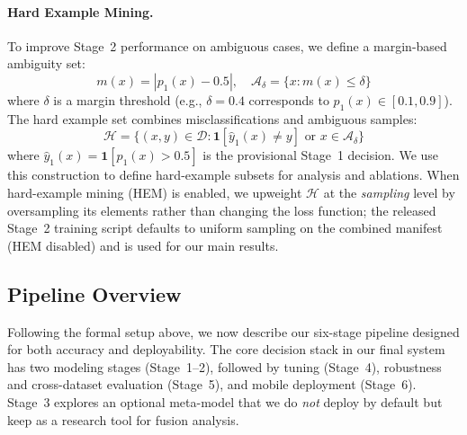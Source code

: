 \paragraph{Hard Example Mining.}
To improve Stage~2 performance on ambiguous cases, we define a margin\hyp based ambiguity set:
\begin{equation}
m(x) = |p_1(x) - 0.5|, \quad \mathcal{A}_\delta = \{x : m(x) \le \delta\}
\end{equation}
\label{eq:ambiguity_set}
where $\delta$ is a margin threshold (e.g., $\delta=0.4$ corresponds to $p_1(x) \in [0.1, 0.9]$). The hard example set combines misclassifications and ambiguous samples:
\begin{equation}
\mathcal{H} = \{(x,y) \in \mathcal{D} : \mathbf{1}[\hat{y}_1(x) \ne y] \text{ or } x \in \mathcal{A}_\delta\}
\end{equation}
\label{eq:hard_set}
where $\hat{y}_1(x) = \mathbf{1}[p_1(x) > 0.5]$ is the provisional Stage~1 decision. We use this construction to define hard\hyp example subsets for analysis and ablations. When hard\hyp example mining (HEM) is enabled, we upweight $\mathcal{H}$ at the \emph{sampling} level by oversampling its elements rather than changing the loss function; the released Stage~2 training script defaults to uniform sampling on the combined manifest (HEM disabled) and is used for our main results.

\subsection{Pipeline Overview}
\label{sec:pipeline_overview}

Following the formal setup above, we now describe our six\hyp stage pipeline designed for both accuracy and deployability. The core decision stack in our final system has two modeling stages (Stage~1–2), followed by tuning (Stage~4), robustness and cross\hyp dataset evaluation (Stage~5), and mobile deployment (Stage~6). Stage~3 explores an optional meta\hyp model that we do \emph{not} deploy by default but keep as a research tool for fusion analysis.

